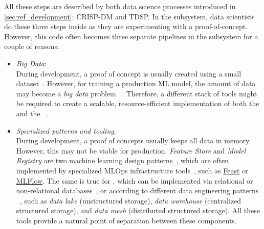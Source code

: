   All these steps are described by both data science processes
  introduced in \cref{sec:ref_development}: CRISP-DM and TDSP.
  In the  subsystem, data scientists
  do these three steps inside  as they are 
  experimenting with a proof-of-concept. However, this code often becomes
  three separate pipelines in the 
  subsystem for a couple of reasons:
  \begin{itemize}
    \item \emph{Big Data}: \\
          During development, a proof of concept is usually created using
          a small dataset~\parencite{Burkov2020MachineEngineering}. However,
          for training a production ML model, the amount of data may become
          a \emph{big data} problem%
          ~\parencite{Diaz-De-Arcaya2023ASurvey,Zhou2017MachineChallenges}.
          Therefore, a different stack of tools might be required to
          create a scalable, resource-efficient implementation of both
          the  and
          the %
          ~\parencite{Diaz-De-Arcaya2023ASurvey,Shankar2024WeLearning}.
    \item \emph{Specialized patterns and tooling}: \\
          During development, a proof of concepts usually keeps all data
          in memory. However, this may not be viable for production.
          \emph{Feature Store} and \emph{Model Registry} are two machine
          learning design patterns~\parencite{Lakshmanan2020MachineMLOps},
          which are often implemented by specialized MLOps infrastructure
          tools~\parencite{Symeonidis2022MLOpsChallenges},
          such as \href{https://feast.dev/}{Feast} or
          \href{https://mlflow.org/}{MLFlow}.
          The same is true for ,
          which can be implemented via relational or non-relational
          databases~\parencite{Sadalage2012NoSQLPersistence},
          or according to different data engineering patterns%
          ~\parencite{Reis2022FundamentalsSystems},
          such as \emph{data lake} (unstructured storage),
          \emph{data warehouse} (centralized structured storage), and
          \emph{data mesh} (distributed structured storage).
          All these tools provide a natural point of separation between
          these components.

\end{itemize}
